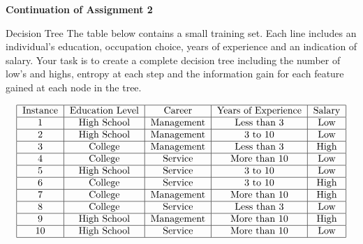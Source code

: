 \documentclass[12pt]{article}
\newcommand{\ques}[1]{\noindent {\bf Question #1: }}
\begin{document}
\begin{center} \textbf{Continuation of Assignment 2} \end{center}

\ques{2} Decision Tree
The table below contains a small training set. Each line includes an individual's education, occupation choice, years of experience and an indication of salary. Your task is to create a complete decision tree including the number of low's and highs, entropy at each step and the information gain for each feature gained at each node in the tree. 

$$ \begin{tabular}{|c|c|c|c|c|} \hline 
Instance & Education Level & Career & Years of Experience & Salary \\ \hline 
1 & High School & Management & Less than 3 & Low \\ \hline 
2 & High School & Management & 3 to 10 & Low \\ \hline 
3 & College & Management & Less than 3 & High \\ \hline 
4 & College & Service & More than 10 & Low \\ \hline
5 & High School & Service & 3 to 10 & Low \\ \hline 
6 & College & Service & 3 to 10 & High \\ \hline 
7 & College & Management & More than 10 & High \\ \hline 
8 & College & Service & Less than 3 & Low \\ \hline
9 & High School & Management & More than 10 & High \\ \hline 
10 & High School & Service & More than 10 & Low \\ \hline \end{tabular} $$ 
\end{document}
